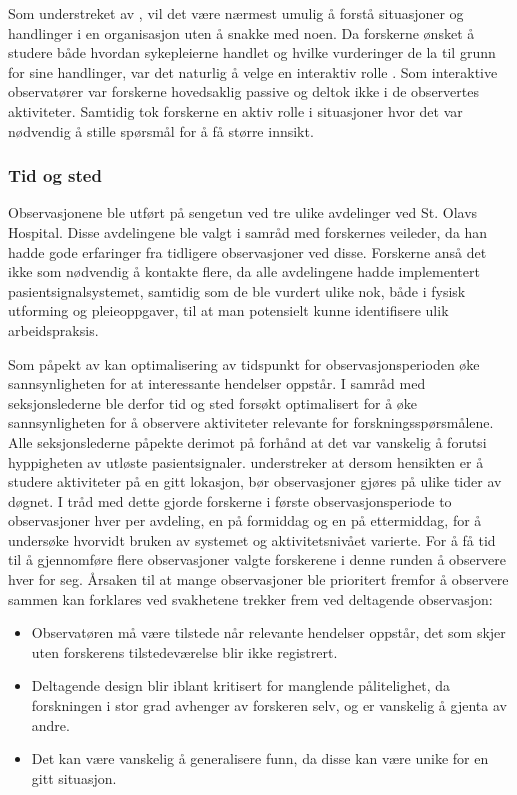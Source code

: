 \noindent
Som understreket av \citet{Myers13}, vil det være nærmest umulig å forstå situasjoner og handlinger i en organisasjon uten å snakke med noen. Da forskerne ønsket å studere både hvordan sykepleierne handlet og hvilke vurderinger de la til grunn for sine handlinger, var det naturlig å velge en interaktiv rolle \citep{Tjora}. Som interaktive observatører var forskerne hovedsaklig passive og deltok ikke i de observertes aktiviteter. Samtidig tok forskerne en aktiv rolle i situasjoner hvor det var nødvendig å stille spørsmål for å få større innsikt.
 
\subsubsection{Tid og sted}
Observasjonene ble utført på sengetun ved tre ulike avdelinger ved St. Olavs Hospital. Disse avdelingene ble valgt i samråd med forskernes veileder, da han hadde gode erfaringer fra tidligere observasjoner ved disse. Forskerne anså det ikke som nødvendig å kontakte flere, da alle avdelingene hadde implementert pasientsignalsystemet, samtidig som de ble vurdert ulike nok, både i fysisk utforming og pleieoppgaver, til at man potensielt kunne identifisere ulik arbeidspraksis.
 
\noindent
Som påpekt av \citet{Millen00} kan optimalisering av tidspunkt for observasjonsperioden øke sannsynligheten for at interessante hendelser oppstår. I samråd med seksjonslederne ble derfor tid og sted forsøkt optimalisert for å øke sannsynligheten for å observere aktiviteter relevante for forskningsspørsmålene. Alle seksjonslederne påpekte derimot på forhånd at det var vanskelig å forutsi hyppigheten av utløste pasientsignaler. \citet{Blomberg93} understreker at dersom hensikten er å studere aktiviteter på en gitt lokasjon, bør observasjoner gjøres på ulike tider av døgnet. I tråd med dette gjorde forskerne i første observasjonsperiode to observasjoner hver per avdeling, en på formiddag og en på ettermiddag, for å undersøke hvorvidt bruken av systemet og aktivitetsnivået varierte. For å få tid til å gjennomføre flere observasjoner valgte forskerene i denne runden å observere hver for seg. Årsaken til at mange observasjoner ble prioritert fremfor å observere sammen kan forklares ved svakhetene \citet{Oates} trekker frem ved deltagende observasjon: 

\begin{itemize}
\item Observatøren må være tilstede når relevante hendelser oppstår, det som skjer uten forskerens tilstedeværelse blir ikke registrert.
\item Deltagende design blir iblant kritisert for manglende pålitelighet, da forskningen i stor grad avhenger av forskeren selv, og er vanskelig å gjenta av andre.
\item Det kan være vanskelig å generalisere funn, da disse kan være unike for en gitt situasjon.
\end{itemize}

